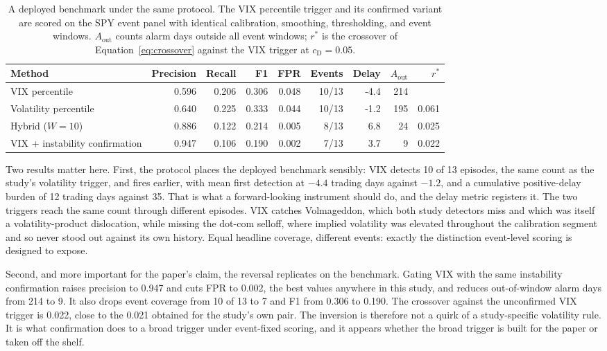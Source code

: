 \documentclass[pdflatex,sn-mathphys-num,iicol]{sn-jnl}
\begin{document}
\begin{table}[t]
\centering
\caption{A deployed benchmark under the same protocol. The VIX percentile trigger and its confirmed variant are scored on the SPY event panel with identical calibration, smoothing, thresholding, and event windows. $A_{\mathrm{out}}$ counts alarm days outside all event windows; $r^{*}$ is the crossover of Equation~\eqref{eq:crossover} against the VIX trigger at $c_{\mathrm{D}}=0.05$.}
\label{tab:vix}
\begin{tabular}{lrrrrrrrr}
\toprule
Method & Precision & Recall & F1 & FPR & Events & Delay & $A_{\mathrm{out}}$ & $r^{*}$\\
\midrule
VIX percentile & 0.596 & 0.206 & 0.306 & 0.048 & 10/13 & -4.4 & 214 & \\
Volatility percentile & 0.640 & 0.225 & 0.333 & 0.044 & 10/13 & -1.2 & 195 & 0.061\\
Hybrid ($W=10$) & 0.886 & 0.122 & 0.214 & 0.005 & 8/13 & 6.8 & 24 & 0.025\\
VIX + instability confirmation & 0.947 & 0.106 & 0.190 & 0.002 & 7/13 & 3.7 & 9 & 0.022\\
\bottomrule
\end{tabular}
\end{table}

Two results matter here. First, the protocol places the deployed benchmark sensibly: VIX detects 10 of 13 episodes, the same count as the study's volatility trigger, and fires earlier, with mean first detection at $-4.4$ trading days against $-1.2$, and a cumulative positive-delay burden of 12 trading days against 35. That is what a forward-looking instrument should do, and the delay metric registers it. The two triggers reach the same count through different episodes. VIX catches Volmageddon, which both study detectors miss and which was itself a volatility-product dislocation, while missing the dot-com selloff, where implied volatility was elevated throughout the calibration segment and so never stood out against its own history. Equal headline coverage, different events: exactly the distinction event-level scoring is designed to expose.

Second, and more important for the paper's claim, the reversal replicates on the benchmark. Gating VIX with the same instability confirmation raises precision to 0.947 and cuts FPR to 0.002, the best values anywhere in this study, and reduces out-of-window alarm days from 214 to 9. It also drops event coverage from 10 of 13 to 7 and F1 from 0.306 to 0.190. The crossover against the unconfirmed VIX trigger is 0.022, close to the 0.021 obtained for the study's own pair. The inversion is therefore not a quirk of a study-specific volatility rule. It is what confirmation does to a broad trigger under event-fixed scoring, and it appears whether the broad trigger is built for the paper or taken off the shelf.
\end{document}
